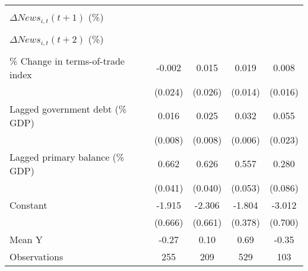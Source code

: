 {\begin{tabular}{l*{4}{c}}
                    &                     &                     &                     &                     \\
\addlinespace
$ \Delta News_{i,t}(t+1)$ (\%)&                     &                     &                     &                     \\
                    &                     &                     &                     &                     \\
\addlinespace
$ \Delta News_{i,t}(t+2)$ (\%)&                     &                     &                     &                     \\
                    &                     &                     &                     &                     \\
\addlinespace
\% Change in terms-of-trade index&      -0.002         &       0.015         &       0.019         &       0.008         \\
                    &     (0.024)         &     (0.026)         &     (0.014)         &     (0.016)         \\
\addlinespace
Lagged government debt (\% GDP)&       0.016\sym{*}  &       0.025\sym{**} &       0.032\sym{***}&       0.055\sym{**} \\
                    &     (0.008)         &     (0.008)         &     (0.006)         &     (0.023)         \\
\addlinespace
Lagged primary balance (\% GDP)&       0.662\sym{***}&       0.626\sym{***}&       0.557\sym{***}&       0.280\sym{***}\\
                    &     (0.041)         &     (0.040)         &     (0.053)         &     (0.086)         \\
\addlinespace
Constant            &      -1.915\sym{**} &      -2.306\sym{***}&      -1.804\sym{***}&      -3.012\sym{***}\\
                    &     (0.666)         &     (0.661)         &     (0.378)         &     (0.700)         \\
\midrule
Mean Y              &       -0.27         &        0.10         &        0.69         &       -0.35         \\
Observations        &         255         &         209         &         529         &         103         \\
\bottomrule
\end{tabular}
}
